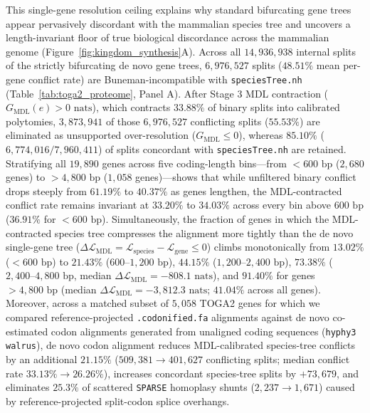 \documentclass[11pt,a4paper]{article}
\begin{document}
This single-gene resolution ceiling explains why standard bifurcating gene trees appear pervasively discordant with the mammalian species tree and uncovers a length-invariant floor of true biological discordance across the mammalian genome (Figure~\ref{fig:kingdom_synthesis}A). Across all $14,936,938$ internal splits of the strictly bifurcating de novo gene trees, $6,976,527$ splits ($48.51\%$ mean per-gene conflict rate) are Buneman-incompatible with \texttt{speciesTree.nh} (Table~\ref{tab:toga2_proteome}, Panel A). After Stage 3 MDL contraction ($G_{\text{MDL}}(e) > 0\text{ nats}$), which contracts $33.88\%$ of binary splits into calibrated polytomies, $3,873,941$ of those $6,976,527$ conflicting splits ($55.53\%$) are eliminated as unsupported over-resolution ($G_{\text{MDL}} \le 0$), whereas $85.10\%$ ($6,774,016 / 7,960,411$) of splits concordant with \texttt{speciesTree.nh} are retained. Stratifying all $19,890$ genes across five coding-length bins---from $<600\text{ bp}$ ($2,680$ genes) to $>4,800\text{ bp}$ ($1,058$ genes)---shows that while unfiltered binary conflict drops steeply from $61.19\%$ to $40.37\%$ as genes lengthen, the MDL-contracted conflict rate remains invariant at $33.20\%$ to $34.03\%$ across every bin above $600\text{ bp}$ ($36.91\%$ for $<600\text{ bp}$). Simultaneously, the fraction of genes in which the MDL-contracted species tree compresses the alignment more tightly than the de novo single-gene tree ($\Delta\mathcal{L}_{\text{MDL}} = \mathcal{L}_{\text{species}} - \mathcal{L}_{\text{gene}} \le 0$) climbs monotonically from $13.02\%$ ($<600\text{ bp}$) to $21.43\%$ ($600\text{--}1,200\text{ bp}$), $44.15\%$ ($1,200\text{--}2,400\text{ bp}$), $73.38\%$ ($2,400\text{--}4,800\text{ bp}$, median $\Delta\mathcal{L}_{\text{MDL}} = -808.1\text{ nats}$), and $91.40\%$ for genes $>4,800\text{ bp}$ (median $\Delta\mathcal{L}_{\text{MDL}} = -3,812.3\text{ nats}$; $41.04\%$ across all genes). Moreover, across a matched subset of $5,058$ TOGA2 genes for which we compared reference-projected \texttt{.codonified.fa} alignments against de novo co-estimated codon alignments generated from unaligned coding sequences (\texttt{hyphy3 walrus}), de novo codon alignment reduces MDL-calibrated species-tree conflicts by an additional $21.15\%$ ($509,381 \to 401,627$ conflicting splits; median conflict rate $33.13\% \to 26.26\%$), increases concordant species-tree splits by $+73,679$, and eliminates $25.3\%$ of scattered \texttt{SPARSE} homoplasy shunts ($2,237 \to 1,671$) caused by reference-projected split-codon splice overhangs.
\end{document}
